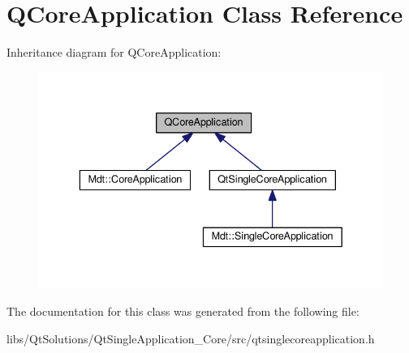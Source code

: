 \hypertarget{class_q_core_application}{}\section{Q\+Core\+Application Class Reference}
\label{class_q_core_application}


Inheritance diagram for Q\+Core\+Application\+:
\nopagebreak
\begin{figure}[H]
\begin{center}
\leavevmode
\includegraphics[width=336pt]{class_q_core_application__inherit__graph}
\end{center}
\end{figure}


The documentation for this class was generated from the following file\+:\begin{DoxyCompactItemize}
\item 
libs/\+Qt\+Solutions/\+Qt\+Single\+Application\+\_\+\+Core/src/qtsinglecoreapplication.\+h\end{DoxyCompactItemize}
